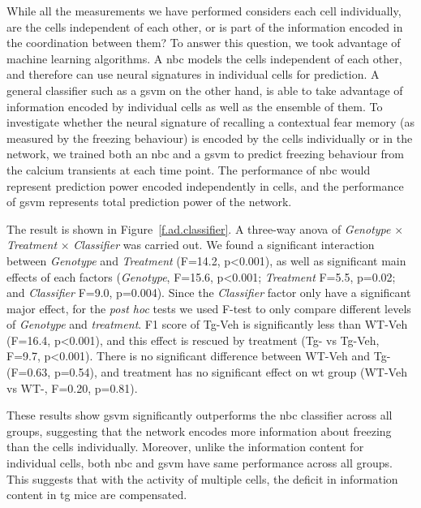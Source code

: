 While all the measurements we have performed considers each cell individually, are the cells independent of each other, or is part of the information encoded in the coordination between them? To answer this question, we took advantage of machine learning algorithms. A \gls{nbc} models the cells independent of each other, and therefore can use neural signatures in individual cells for prediction. A general classifier such as a \gls{gsvm} on the other hand, is able to take advantage of information encoded by individual cells as well as the ensemble of them. To investigate whether the neural signature of recalling a contextual fear memory (as measured by the freezing behaviour) is encoded by the cells individually or in the network, we trained both an \gls{nbc} and a \gls{gsvm} to predict freezing behaviour from the calcium transients at each time point. The performance of \gls{nbc} would represent prediction power encoded independently in cells, and the performance of \gls{gsvm} represents total prediction power of the network.

The result is shown in Figure~\ref{f.ad.classifier}. A three-way \gls{anova} of \textit{Genotype} $\times$ \textit{Treatment} $\times$ \textit{Classifier} was carried out. We found a significant interaction between \textit{Genotype} and \textit{Treatment} (F=14.2, p<0.001), as well as significant main effects of each factors (\textit{Genotype}, F=15.6, p<0.001; \textit{Treatment} F=5.5, p=0.02; and \textit{Classifier} F=9.0, p=0.004). Since the \textit{Classifier} factor only have a significant major effect, for the \textit{post hoc} tests we used F-test to only compare different levels of \textit{Genotype} and \textit{treatment}. F1 score of Tg-Veh is significantly less than WT-Veh (F=16.4, p<0.001), and this effect is rescued by \tglu{} treatment (Tg-\glu{} vs Tg-Veh, F=9.7, p<0.001). There is no significant difference between WT-Veh and Tg-\glu{} (F=0.63, p=0.54), and \tglu{} treatment has no significant effect on \gls{wt} group (WT-Veh vs WT-\glu, F=0.20, p=0.81).  

These results show \gls{gsvm} significantly outperforms the \gls{nbc} classifier across all groups, suggesting that the network encodes more information about freezing than the cells individually. Moreover, unlike the information content for individual cells, both \gls{nbc} and \gls{gsvm} have same performance across all groups. This suggests that with the activity of multiple cells, the deficit in information content in \gls{tg} mice are compensated. 

